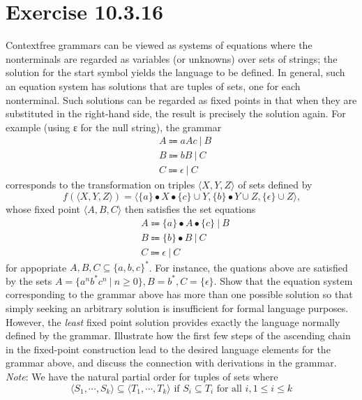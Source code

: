 \documentclass{article}[12pt]
\newcommand{\myif}{\ensuremath{\text{ if }}}
\begin{document}
\section{Exercise 10.3.16} Contextfree
grammars can be viewed as systems of equations where the
nonterminals are regarded as variables (or unknowns) over sets of strings;
the solution for the start symbol yields the language to be defined. In
general, such an equation system has solutions that are tuples of sets,
one for each nonterminal. Such solutions can be regarded as fixed points
in that when they are substituted in the right-hand side, the result is
precisely the solution again. For example (using ε for the null string), the
grammar
\begin{align*}
    &A \Coloneqq aAc\ |\ B\\
    &B \Coloneqq bB\ |\ C\\
    &C \Coloneqq \epsilon\ |\ C
\end{align*}
corresponds to the transformation on triples $\langle X,Y,Z \rangle$ of sets defined
by
\begin{equation*}
    f(\langle X,Y,Z \rangle) = \langle \{a\} \bullet X \bullet \{c\} \cup Y, \{b\} \bullet Y \cup Z, \{\epsilon\} \cup Z \rangle \text{,}
\end{equation*}
whose fixed point $\langle A,B,C \rangle$ then satisfies the set equations
\begin{align*}
    &A \Coloneqq \{a\} \bullet A \bullet \{c\}\ |\ B\\
    &B \Coloneqq \{b\} \bullet B\ |\ C\\
    &C \Coloneqq \epsilon\ |\ C
\end{align*}
for appopriate $A,B,C \subseteq \{a,b,c\}^*$. For instance, the quations above are satisfied by the sets
$A = \{a^nb^*c^n\ |\ n \geq 0\}, B = b^*, C = \{\epsilon\}$.
Show that the equation system corresponding to the grammar above
has more than one possible solution so that simply seeking an arbitrary
solution is insufficient for formal language purposes. However, the \textit{least}
fixed point solution provides exactly the language normally defined by
the grammar. Illustrate how the first few steps of the ascending chain in
the fixed-point construction lead to the desired language elements for
the grammar above, and discuss the connection with derivations in the
grammar.\\
\textit{Note}: We have the natural partial order for tuples of sets where
\begin{equation*}
    \langle S_1, \cdots, S_k \rangle \subseteq \langle T_1, \cdots, T_k \rangle \myif S_i \subseteq T_i \text{ for all } i, 1 \leq i \leq k
\end{equation*}
\end{document}
